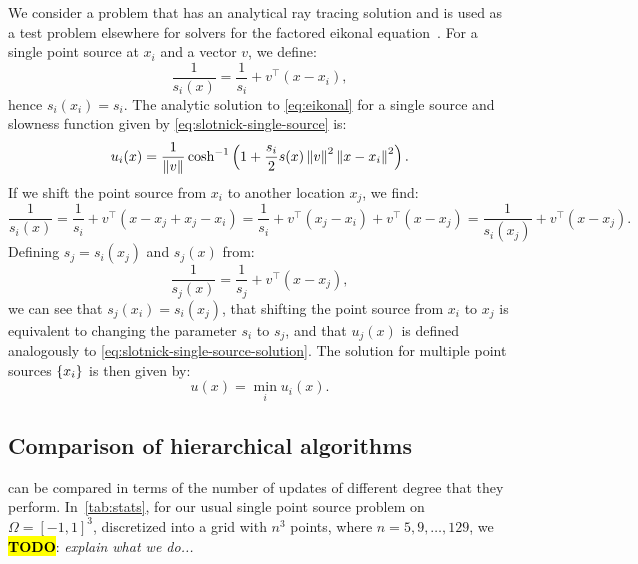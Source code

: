 \documentclass[sisc-eikonal.tex]{subfiles}
\begin{document}
We consider a problem that has an analytical ray tracing solution and
is used as a test problem elsewhere for solvers for the factored
eikonal
equation~\cite{slotnick1959lessons,fomel2009fast,qi2018corner}. For a
single point source at $x_i$ and a vector $v$, we define:
\begin{equation}
  \label{eq:slotnick-single-source}
  \frac{1}{s_i(x)} = \frac{1}{s_i} + v^\top {(x - x_i)},
\end{equation}
hence $s_i(x_i) = s_i$. The analytic solution to \cref{eq:eikonal} for a
single source and slowness function given by
\cref{eq:slotnick-single-source} is:
\begin{equation}
  \label{eq:slotnick-single-source-solution}
  u_i(x) = \frac{1}{\norm{v}} \cosh^{-1} \parens{1 + \frac{s_i}{2} s(x) \norm{v}^2 \norm{x - x_i}^2}.
\end{equation}
If we shift the point source from $x_i$ to another location $x_j$, we
find:
\begin{equation}
  \label{eq:slotnick-slowness-shift}
  \frac{1}{s_i(x)} = \frac{1}{s_i} + v^\top {(x - x_j + x_j - x_i)} = \frac{1}{s_i} + v^\top {(x_j - x_i)} + v^\top {(x - x_j)} = \frac{1}{s_i(x_j)} + v^\top {(x - x_j)}.
\end{equation}
Defining $s_j = s_i(x_j)$ and $s_j(x)$ from:
\begin{equation}
  \frac{1}{s_j(x)} = \frac{1}{s_j} + v^\top {(x - x_j)},
\end{equation}
we can see that $s_j(x_i) = s_i(x_j)$, that shifting the point source
from $x_i$ to $x_j$ is equivalent to changing the parameter $s_i$ to
$s_j$, and that $u_j(x)$ is defined analogously to
\cref{eq:slotnick-single-source-solution}. The solution for multiple
point sources $\left\{x_i\right\}$ is then given by:
\begin{equation}
  u(x) = \min_i u_i(x).
\end{equation}

\subsection{Comparison of hierarchical algorithms}\label{ssec:alg-comparison}

 can be compared in terms of the
number of updates of different degree that they
perform. In~\cref{tab:stats}, for our usual single point source
problem on $\Omega = [-1, 1]^3$, discretized into a grid with $n^3$
points, where $n = 5, 9, \hdots, 129$, we \hl{\textbf{TODO}}:
\emph{explain what we do...}

\begin{table}
  \centering
  
  \caption{Table of update statistics for~\cref{ssec:alg-comparison}.}
  \label{tab:stats}
\end{table}
\end{document}
